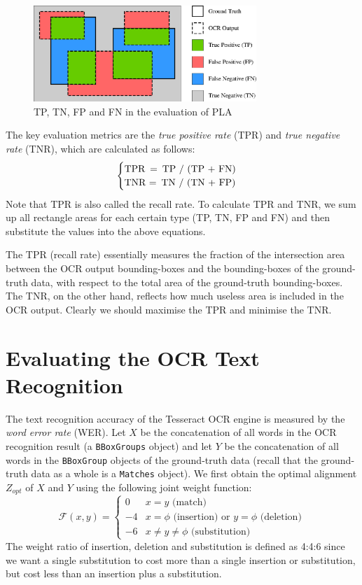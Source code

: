 \begin{figure}[!htb]
    \centering
    \includegraphics[width=0.75\textwidth]{eval-ocr-pla.eps}
    \caption{TP, TN, FP and FN in the evaluation of PLA}
    \label{fig:eval-ocr-pla}
\end{figure}

The key evaluation metrics are the \textit{true positive rate} (TPR) and \textit{true negative rate} (TNR), which are calculated as follows:
\[
    \begin{cases}
        \text{TPR \,=\, TP / (TP + FN)} \\
        \text{TNR =\, TN / (TN + FP)}
    \end{cases}
\]
Note that TPR is also called the recall rate. To calculate TPR and TNR, we sum up all rectangle areas for each certain type (TP, TN, FP and FN) and then substitute the values into the above equations.

The TPR (recall rate) essentially measures the fraction of the intersection area between the OCR output bounding-boxes and the bounding-boxes of the ground-truth data, with respect to the total area of the ground-truth bounding-boxes. The TNR, on the other hand, reflects how much useless area is included in the OCR output. Clearly we should maximise the TPR and minimise the TNR.


\section{Evaluating the OCR Text Recognition}

The text recognition accuracy of the Tesseract OCR engine is measured by the \textit{word error rate} (WER). Let $X$ be the concatenation of all words in the OCR recognition result (a \texttt{BBoxGroups} object) and let $Y$ be the concatenation of all words in the \texttt{BBoxGroup} objects of the ground-truth data (recall that the ground-truth data as a whole is a \texttt{Matches} object). We first obtain the optimal alignment $Z_{opt}$ of $X$ and $Y$ using the following joint weight function:
\begin{equation}
    \mathcal{F}(x,y) = 
    \begin{cases}
        0 & x = y \text{ (match)} \\
        -4 & x = \phi \text{ (insertion) or } y = \phi \text{ (deletion)} \\
        -6 & x \neq y \neq \phi \text{ (substitution)}
    \end{cases}
\end{equation}
The weight ratio of insertion, deletion and substitution is defined as 4:4:6 since we want a single substitution to cost more than a single insertion or substitution, but cost less than an insertion plus a substitution. 

